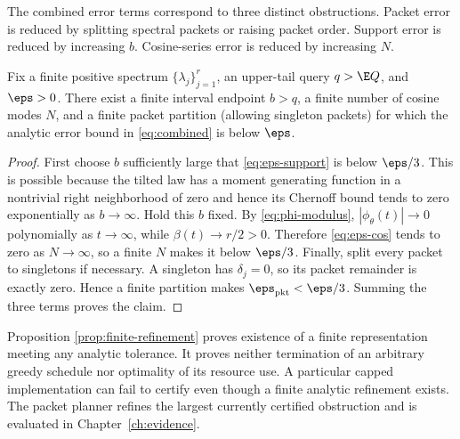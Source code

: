 The combined error terms correspond to three distinct obstructions. Packet error is reduced by splitting spectral packets or raising packet order. Support error is reduced by increasing $b$. Cosine-series error is reduced by increasing $N$.

\begin{proposition}
\label{prop:finite-refinement}
Fix a finite positive spectrum $\{\lambda_j\}_{j=1}^{r}$, an upper-tail query $q>\E Q$, and $\eps>0$. There exist a finite interval endpoint $b>q$, a finite number of cosine modes $N$, and a finite packet partition (allowing singleton packets) for which the analytic error bound in \eqref{eq:combined} is below $\eps$.
\end{proposition}

\begin{proof}
First choose $b$ sufficiently large that \eqref{eq:eps-support} is below $\eps/3$. This is possible because the tilted law has a moment generating function in a nontrivial right neighborhood of zero and hence its Chernoff bound tends to zero exponentially as $b\to\infty$. Hold this $b$ fixed. By \eqref{eq:phi-modulus}, $|\phi_{\theta}(t)|\to0$ polynomially as $t\to\infty$, while $\beta(t)\to r/2>0$. Therefore \eqref{eq:eps-cos} tends to zero as $N\to\infty$, so a finite $N$ makes it below $\eps/3$. Finally, split every packet to singletons if necessary. A singleton has $\delta_j=0$, so its packet remainder is exactly zero. Hence a finite partition makes $\eps_{\mathrm{pkt}}<\eps/3$. Summing the three terms proves the claim.
\end{proof}

\begin{remark}\label{claim:final-26-14}
Proposition \ref{prop:finite-refinement} proves existence of a finite representation meeting any analytic tolerance. It proves neither termination of an arbitrary greedy schedule nor optimality of its resource use. A particular capped implementation can fail to certify even though a finite analytic refinement exists. The packet planner refines the largest currently certified obstruction and is evaluated in Chapter~\ref{ch:evidence}.
\end{remark}


